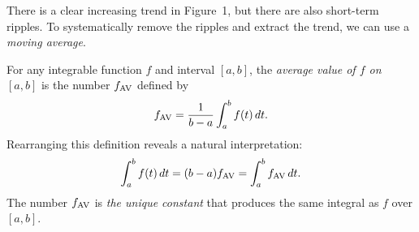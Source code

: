 \documentclass[answers]{exam}
\newcommand{\onestar}{\raisebox{0.05cm}{\resizebox{1.6cm}{!}{$\bigstar\largewhitestar\largewhitestar\largewhitestar$ \ }}}
\begin{document}
\begin{questions}\setcounter{question}{1} 

\question[12]
There is a clear increasing trend in Figure~1,
but there are also short-term ripples.
To systematically remove the ripples
and extract the trend,
we can use a \emph{moving average}.

For any integrable function $f$ and interval $[a,b]$,
the \emph{average value of $f$ on $[a,b]$} is the number
$f_{\rm AV}$ defined by
\[
f_{\rm AV} = \dfrac{1}{b-a}\int_a^b f(t)\,dt.
\]
Rearranging this definition reveals a natural interpretation:
\[
\int_a^b f(t)\,dt
= (b-a) f_{\rm AV}
= \int_a^b f_{\rm AV}\,dt.
\]
The number $f_{\rm AV}$ is \emph{the unique constant} 
that produces the same integral as $f$ over $[a,b]$.

\end{questions}
\end{document}

